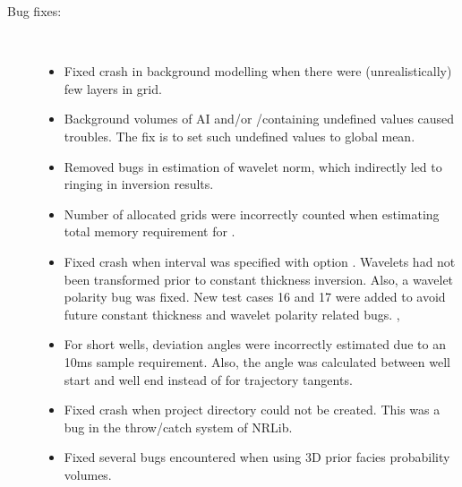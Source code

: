 \begin{description}
\item [Bug fixes:] \mbox{ }
  \begin{itemize}
    \item Fixed crash in background modelling when there were
      (unrealistically) few layers in grid. 
    \item Background volumes of AI and\!/\!or \vp/\vs containing undefined
      values caused troubles. The fix is to set such undefined values
      to global mean. 
    \item Removed bugs in estimation of wavelet norm, which indirectly
      led to ringing in inversion results. 
    \item Number of allocated grids were incorrectly counted when
      estimating total memory requirement for \crava. 
    \item Fixed crash when interval was specified with option
      . Wavelets had not been transformed
      prior to constant thickness inversion. Also, a wavelet polarity
      bug was fixed. New test cases 16 and 17 were added to avoid
      future constant thickness and wavelet polarity related
      bugs. , 
    \item For short wells, deviation angles were incorrectly estimated
      due to an 10ms sample requirement. Also, the angle was
      calculated between well start and well end instead of for
      trajectory tangents.
    \item Fixed crash when project directory could not be
      created. This was a bug in the throw/catch system of
      NRLib. 
    \item Fixed several bugs encountered when using 3D prior facies
      probability volumes. 
 \end{itemize}
\end{description}
